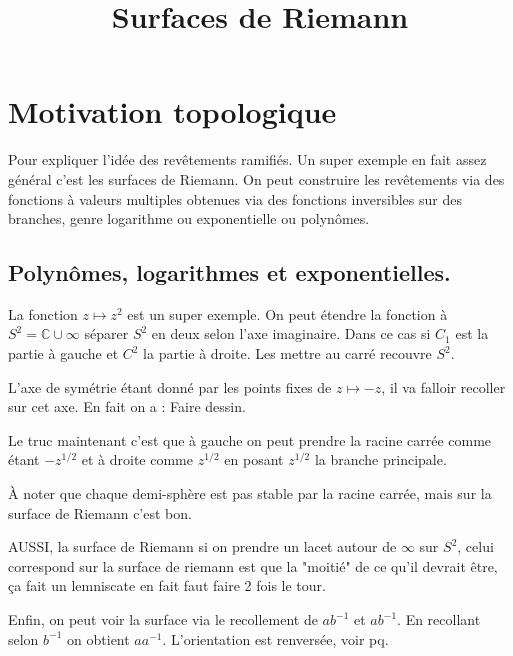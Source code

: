 \documentclass[a4paper,12pt]{book}
\title{Surfaces de Riemann}
\date{}
\newcommand{\C}{\mathbb{C}}
\theoremstyle{plain}
\theoremstyle{definition}
\theoremstyle{remark}
\begin{document}
\maketitle

\section{Motivation topologique}
Pour expliquer l'idée des revêtements ramifiés. Un
super exemple en fait assez général c'est les surfaces
de Riemann. On peut construire les revêtements via des
fonctions à valeurs multiples obtenues via des fonctions
inversibles sur des branches, genre logarithme ou
exponentielle ou polynômes. 

\subsection{Polynômes, logarithmes et exponentielles.}
La fonction $z\mapsto z^2$ est un super exemple. On 
peut étendre la fonction à $S^2=\C\cup \infty$ séparer 
$S^2$ en deux selon l'axe imaginaire. Dans ce cas
si $C_1$ est la partie à gauche et $C^2$ la partie
à droite. Les mettre au carré recouvre $S^2$. 

L'axe de symétrie étant donné par les points fixes de
$z\mapsto -z$, il va falloir recoller sur cet axe.
En fait on a : Faire dessin.


Le truc maintenant c'est que à gauche on peut prendre la
racine carrée comme étant $-z^{1/2}$ et à droite comme
$z^{1/2}$ en posant $z^{1/2}$ la branche principale.

À noter que chaque demi-sphère est pas stable par la
racine carrée, mais sur la surface de Riemann c'est
bon.

AUSSI, la surface de Riemann si on prendre un lacet
autour de $\infty$ sur $S^2$, celui correspond sur
la surface de riemann est que la "moitié" de ce qu'il
devrait être, ça fait un lemniscate en fait faut
faire 2 fois le tour.

Enfin, on peut voir la surface via le recollement de
$ab^{-1}$ et $ab^{-1}$. En recollant selon $b^{-1}$
on obtient $aa^{-1}$. L'orientation est renversée,
voir pq.
\end{document}

